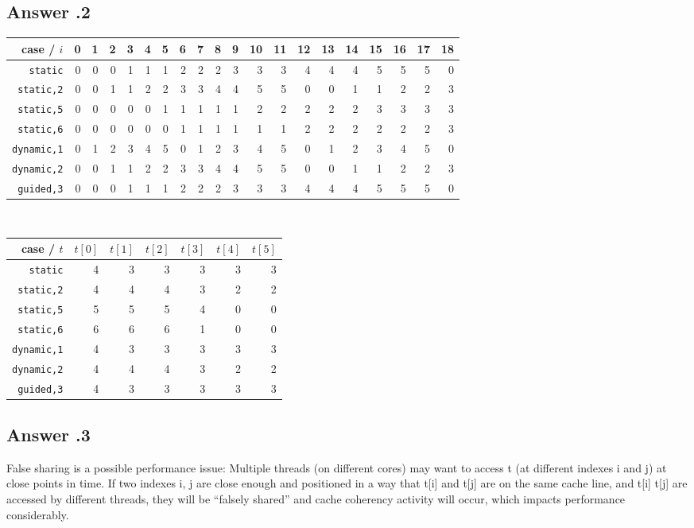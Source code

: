 \documentclass[a4paper,%
11pt,%
DIV=12,
headsepline,%
headings=normal,
]{scrartcl}
\newcounter{curex}
\newcommand{\answer}[1]{\subsection*{Answer \arabic{curex}.#1}}
\begin{document}
\answer{2}


\begin{tabular}{rrrrrrrrrrrrrrrrrrrr}
  \toprule
 case /  $i$ & 0 & 1 & 2 & 3 & 4 & 5 & 6 & 7 & 8 & 9 & 10 & 11 & 12 & 13 & 14 & 15 & 16 & 17 & 18  \\
  \midrule
\texttt{static}     & 0 & 0 & 0 & 1 & 1 & 1 & 2 & 2 & 2 & 3 & 3 & 3 & 4 & 4 & 4 & 5 & 5 & 5 & 0 \\
\texttt{static,2}   & 0 & 0 & 1 & 1 & 2 & 2 & 3 & 3 & 4 & 4 & 5 & 5 & 0 & 0 & 1 & 1 & 2 & 2 & 3 \\
\texttt{static,5}   & 0 & 0 & 0 & 0 & 0 & 1 & 1 & 1 & 1 & 1 & 2 & 2 & 2 & 2 & 2 & 3 & 3 & 3 & 3 \\
\texttt{static,6}   & 0 & 0 & 0 & 0 & 0 & 0 & 1 & 1 & 1 & 1 & 1 & 1 & 2 & 2 & 2 & 2 & 2 & 2 & 3 \\ 
\texttt{dynamic,1}  & 0 & 1 & 2 & 3 & 4 & 5 & 0 & 1 & 2 & 3 & 4 & 5 & 0 & 1 & 2 & 3 & 4 & 5 & 0 \\
\texttt{dynamic,2}  & 0 & 0 & 1 & 1 & 2 & 2 & 3 & 3 & 4 & 4 & 5 & 5 & 0 & 0 & 1 & 1 & 2 & 2 & 3 \\
  \texttt{guided,3} & 0 & 0 & 0 & 1 & 1 & 1 & 2 & 2 & 2 & 3 & 3 & 3 & 4 & 4 & 4 & 5 & 5 & 5 & 0 \\
  \bottomrule
\end{tabular}\\

\begin{tabular}{rrrrrrr}
  \toprule
case / $t$             & $t[0]$ & $t[1]$ & $t[2]$ & $t[3]$ & $t[4]$ & $t[5]$ \\  
  \midrule
\texttt{static}    & 4 & 3 & 3 & 3 & 3 & 3 \\
\texttt{static,2}  & 4 & 4 & 4 & 3 & 2 & 2 \\
\texttt{static,5}  & 5 & 5 & 5 & 4 & 0 & 0 \\
\texttt{static,6}  & 6 & 6 & 6 & 1 & 0 & 0 \\
\texttt{dynamic,1} & 4 & 3 & 3 & 3 & 3 & 3 \\
\texttt{dynamic,2} & 4 & 4 & 4 & 3 & 2 & 2 \\
\texttt{guided,3}  & 4 & 3 & 3 & 3 & 3 & 3 \\
    \bottomrule
\end{tabular}

\answer{3}
False sharing is a possible performance issue:
Multiple threads (on different cores) may want to access t (at different indexes i and j) at close points in time. If two indexes i, j are close enough and positioned in a way that t[i] and t[j] are on the same cache line, and t[i] t[j] are accessed by different threads, they will be ``falsely shared'' and cache coherency activity will occur, which impacts performance considerably. 
\end{document}
